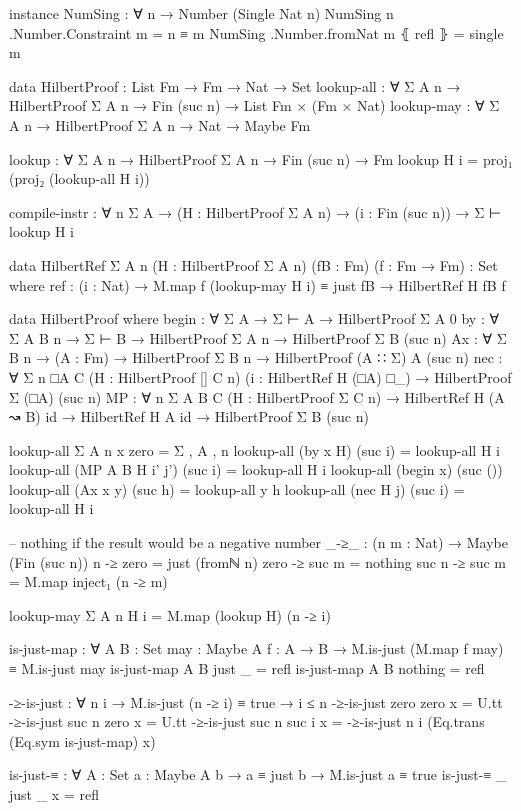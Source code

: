 \begin{spverbatim}
instance
  NumSing : ∀ {n} → Number (Single {Nat} n)
  NumSing {n} .Number.Constraint m = n ≡ m
  NumSing .Number.fromNat m ⦃ refl ⦄ = single m

data HilbertProof : List Fm → Fm → Nat → Set
lookup-all : ∀ {Σ A n} → HilbertProof Σ A n → Fin (suc n) → List Fm × (Fm × Nat)
lookup-may : ∀ {Σ A n} → HilbertProof Σ A n → Nat → Maybe Fm

lookup : ∀ {Σ A n} → HilbertProof Σ A n → Fin (suc n) → Fm
lookup H i = proj₁ (proj₂ (lookup-all H i))

compile-instr : ∀ {n Σ A} → (H : HilbertProof Σ A n) → (i : Fin (suc n)) → Σ ⊢ lookup H i

data HilbertRef {Σ A n} (H : HilbertProof Σ A n) (fB : Fm) (f : Fm → Fm) : Set where
  ref : (i : Nat) → M.map f (lookup-may H i) ≡ just fB → HilbertRef H fB f

data HilbertProof where
  begin : ∀ {Σ A} → Σ ⊢ A → HilbertProof Σ A 0
  by : ∀ {Σ A B n} → Σ ⊢ B → HilbertProof Σ A n → HilbertProof Σ B (suc n)
  Ax : ∀ {Σ B n} → (A : Fm) → HilbertProof Σ B n → HilbertProof (A ∷ Σ) A (suc n)
  nec : ∀ {Σ n □A C} (H : HilbertProof [] C n) (i : HilbertRef H (□A) □_)
    → HilbertProof Σ (□A) (suc n)
  MP : ∀ {n Σ A B C} (H : HilbertProof Σ C n) → HilbertRef H (A ↝ B) id → HilbertRef H A id → HilbertProof Σ B (suc n)

lookup-all {Σ} {A} {n} x zero = Σ , A , n
lookup-all (by x H) (suc i) = lookup-all H i
lookup-all (MP {A} {B} H i' j') (suc i) = lookup-all H i
lookup-all (begin x) (suc ())
lookup-all (Ax x y) (suc h) = lookup-all y h
lookup-all (nec H j) (suc i) = lookup-all H i

-- nothing if the result would be a negative number
_-≥_ : (n m : Nat) → Maybe (Fin (suc n))
n -≥ zero = just (fromℕ n)
zero -≥ suc m = nothing
suc n -≥ suc m = M.map inject₁ (n -≥ m)

lookup-may {Σ} {A} {n} H i = M.map (lookup H) (n -≥ i)

is-just-map : ∀ {A B : Set} {may : Maybe A} {f : A → B}
  → M.is-just (M.map f may) ≡ M.is-just may
is-just-map {A} {B} {just _} = refl
is-just-map {A} {B} {nothing} = refl

-≥-is-just : ∀ {n i} → M.is-just (n -≥ i) ≡ true → i ≤ n
-≥-is-just {zero} {zero} x = U.tt
-≥-is-just {suc n} {zero} x = U.tt
-≥-is-just {suc n} {suc i} x = -≥-is-just {n} {i} (Eq.trans (Eq.sym is-just-map) x)

is-just-≡ : ∀ {A : Set} {a : Maybe A} {b} → a ≡ just b → M.is-just a ≡ true
is-just-≡ {_} {just _} x = refl


\end{spverbatim}
